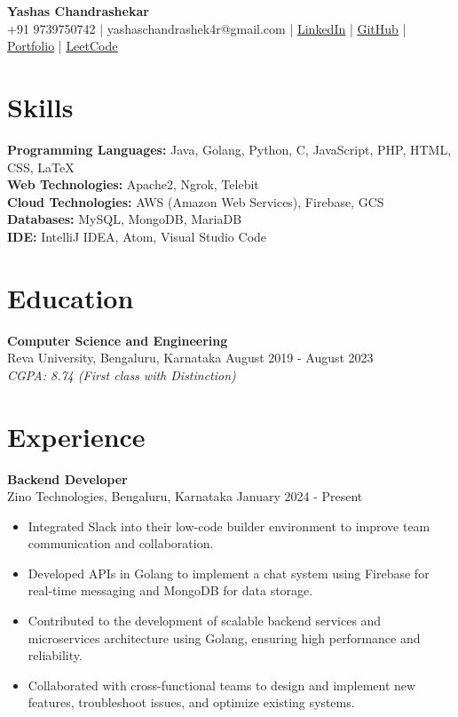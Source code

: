 \documentclass[a4paper,15pt]{article}
\begin{document}
\pagestyle{empty}

\begin{center}
    \textbf{\LARGE Yashas Chandrashekar} \\
    \vspace{2mm}
    +91 9739750742 | yashaschandrashek4r@gmail.com | \href{https://linkedin.com/in/yashaschandrashekar}{\underline{LinkedIn}} | \href{https://github.com/yashasc2k1}{\underline{GitHub}} | \href{https://yashasc2k1.github.io/YashasChandrashekar/}{\underline{Portfolio}} | \href{https://leetcode.com/YashasC/}{\underline{LeetCode}}
\end{center}

\section*{Skills}
\textbf{Programming Languages:}
Java, Golang, Python, C, JavaScript, PHP, HTML, CSS, \LaTeX \\
\textbf{Web Technologies:}
Apache2, Ngrok, Telebit \\
\textbf{Cloud Technologies:}
AWS (Amazon Web Services), Firebase, GCS \\
\textbf{Databases:}
MySQL, MongoDB, MariaDB \\
\textbf{IDE:}
IntelliJ IDEA, Atom, Visual Studio Code

\section*{Education}
\textbf{Computer Science and Engineering} \\
Reva University, Bengaluru, Karnataka \hfill August 2019 - August 2023 \\
\textit{CGPA: 8.74 (First class with Distinction)}

\section*{Experience}
\textbf{Backend Developer} \\
Zino Technologies, Bengaluru, Karnataka \hfill January 2024 - Present
\begin{itemize}
    \item Integrated Slack into their low-code builder environment to improve team communication and collaboration.
    \item Developed APIs in Golang to implement a chat system using Firebase for real-time messaging and MongoDB for data storage.
    \item Contributed to the development of scalable backend services and microservices architecture using Golang, ensuring high performance and reliability.
    \item Collaborated with cross-functional teams to design and implement new features, troubleshoot issues, and optimize existing systems.
\end{itemize}
\end{document}
